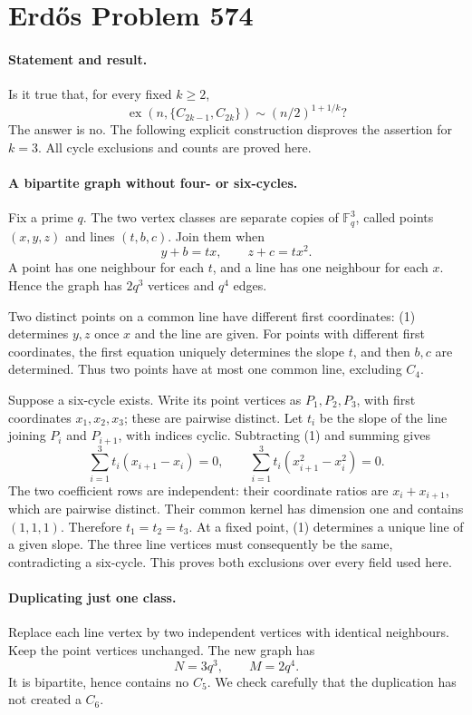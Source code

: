 \section*{Erd\H{o}s Problem 574}

\paragraph{Statement and result.}
Is it true that, for every fixed \(k\geq2\),
\[
 \operatorname{ex}(n,\{C_{2k-1},C_{2k}\})\sim(n/2)^{1+1/k}?
\]
The answer is no. The following explicit construction disproves the assertion for \(k=3\). All cycle exclusions and counts are proved here.

\paragraph{A bipartite graph without four- or six-cycles.}
Fix a prime \(q\). The two vertex classes are separate copies of \(\mathbb F_q^3\), called points \((x,y,z)\) and lines \((t,b,c)\). Join them when
\[
 y+b=tx,\qquad z+c=tx^2. \tag{1}
\]
A point has one neighbour for each \(t\), and a line has one neighbour for each \(x\). Hence the graph has \(2q^3\) vertices and \(q^4\) edges.

Two distinct points on a common line have different first coordinates: (1) determines \(y,z\) once \(x\) and the line are given. For points with different first coordinates, the first equation uniquely determines the slope \(t\), and then \(b,c\) are determined. Thus two points have at most one common line, excluding \(C_4\).

Suppose a six-cycle exists. Write its point vertices as \(P_1,P_2,P_3\), with first coordinates \(x_1,x_2,x_3\); these are pairwise distinct. Let \(t_i\) be the slope of the line joining \(P_i\) and \(P_{i+1}\), with indices cyclic. Subtracting (1) and summing gives
\[
 \sum_{i=1}^3 t_i(x_{i+1}-x_i)=0,
 \qquad
 \sum_{i=1}^3 t_i(x_{i+1}^2-x_i^2)=0. \tag{2}
\]
The two coefficient rows are independent: their coordinate ratios are \(x_i+x_{i+1}\), which are pairwise distinct. Their common kernel has dimension one and contains \((1,1,1)\). Therefore \(t_1=t_2=t_3\). At a fixed point, (1) determines a unique line of a given slope. The three line vertices must consequently be the same, contradicting a six-cycle. This proves both exclusions over every field used here.

\paragraph{Duplicating just one class.}
Replace each line vertex by two independent vertices with identical neighbours. Keep the point vertices unchanged. The new graph has
\[
 N=3q^3,\qquad M=2q^4. \tag{3}
\]
It is bipartite, hence contains no \(C_5\). We check carefully that the duplication has not created a \(C_6\).

